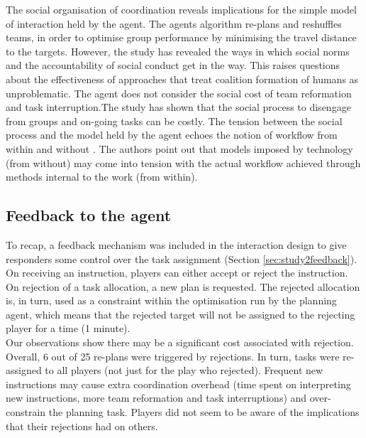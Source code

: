The social organisation of coordination reveals implications for the simple model of interaction held by the agent. The agents algorithm re-plans and reshuffles teams, in order to optimise group performance by minimising the travel distance to the targets. However, the study has revealed the ways in which social norms and the accountability of social conduct get in the way. This raises questions about the effectiveness of approaches that treat coalition formation of humans as unproblematic. The agent does not consider the social cost of team reformation and task interruption.The study has shown that the social process to disengage from groups and on-going tasks can be costly. The tension between the social process and the model held by the agent echoes the notion of workflow from within and without \cite{Bowers1994}. The authors point out that models imposed by technology (from without) may come into tension with the actual workflow achieved through methods internal to the work (from within). 



\subsection{Feedback to the agent}\label{sec:studytwofeedback}

To recap, a feedback mechanism was included in the interaction design to give responders some control over the task assignment (Section \ref{sec:study2feedback}). On receiving an instruction, players can either accept or reject the instruction. On rejection of a task allocation, a new plan is requested. The rejected allocation is, in turn, used as a constraint within the optimisation run by the planning agent, which means that the rejected target will not be assigned to the rejecting player for a time (1 minute). \\

Our observations show there may be a significant cost associated with rejection. Overall, 6 out of 25 re-plans were triggered by rejections. In turn, tasks were re-assigned to all players (not just for the play who rejected). Frequent new instructions may cause extra coordination overhead (time spent on interpreting new instructions, more team reformation and task interruptions) and over-constrain the planning task. Players did not seem to be aware of the implications that their rejections had on others.\\
 

